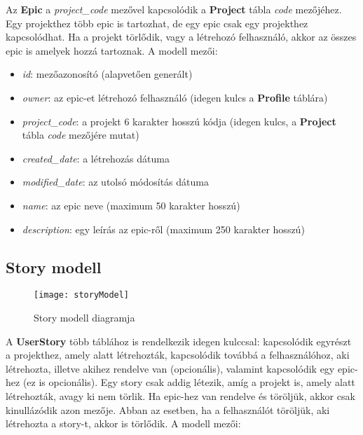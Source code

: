 Az \textbf{Epic} a \textit{project\_code} mezővel kapcsolódik a \textbf{Project} tábla \textit{code} mezőjéhez. Egy projekthez több epic is tartozhat, de egy epic csak egy projekthez kapcsolódhat. Ha a projekt törlődik, vagy a létrehozó felhasználó, akkor az összes epic is amelyek hozzá tartoznak. A modell mezői:

\begin{itemize}
	\item \textit{id}: mezőazonosító (alapvetően generált)
	\item \textit{owner}: az epic-et létrehozó felhasználó (idegen kulcs a \textbf{Profile} táblára)
	\item \textit{project\_code}: a projekt 6 karakter hosszú kódja (idegen kulcs, a \textbf{Project} tábla \textit{code} mezőjére mutat)
	\item \textit{created\_date}: a létrehozás dátuma
	\item \textit{modified\_date}: az utolsó módosítás dátuma
	\item \textit{name}: az epic neve (maximum 50 karakter hosszú)
	\item \textit{description}: egy leírás az epic-ről (maximum 250 karakter hosszú)
\end{itemize}

\subsection{Story modell}

\begin{figure}[H]
	\centering
	\texttt{[image: storyModel]}
	\caption{Story modell diagramja}
	\label{fig:storymodel}
\end{figure}

A \textbf{UserStory} több táblához is rendelkezik idegen kulccsal: kapcsolódik egyrészt a projekthez, amely alatt létrehozták, kapcsolódik továbbá a felhasználóhoz, aki létrehozta, illetve akihez rendelve van (opcionális), valamint kapcsolódik egy epic-hez (ez is opcionális). Egy story csak addig létezik, amíg a projekt is, amely alatt létrehozták, avagy ki nem törlik. Ha epic-hez van rendelve és töröljük, akkor csak kinullázódik azon mezője. Abban az esetben, ha a felhasználót töröljük, aki létrehozta a story-t, akkor is törlődik. A modell mezői:


